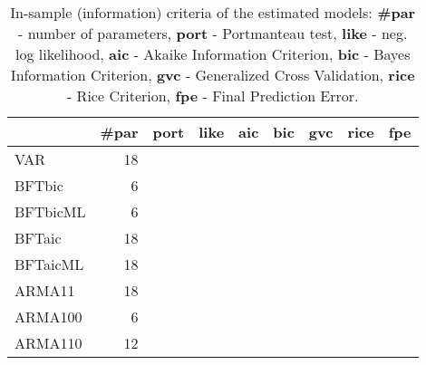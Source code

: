 \documentclass[]{article}
\begin{document}
\begin{table}

\caption{\label{tab:infoTests2}In-sample (information) criteria of the estimated models: 
\textbf{\#par} - number of parameters, \textbf{port} - Portmanteau test, 
\textbf{like} - neg. log likelihood, \textbf{aic} - Akaike Information Criterion,
\textbf{bic} - Bayes  Information Criterion, \textbf{gvc} - Generalized Cross Validation,
\textbf{rice}  - Rice Criterion,  \textbf{fpe} - Final Prediction Error.}
\centering
\begin{tabular}[t]{lrlllllll}
\toprule
\textbf{ } & \textbf{\#par} & \textbf{port} & \textbf{like} & \textbf{aic} & \textbf{bic} & \textbf{gvc} & \textbf{rice} & \textbf{fpe}\\
\midrule
VAR & 18 & \cellcolor{white}{129.6} & \cellcolor{white}{510.6} & \cellcolor{white}{1057.2} & \cellcolor{white}{1129.4} & \cellcolor{white}{1058} & \cellcolor{white}{1058.8} & \cellcolor{white}{1057.2}\\
BFTbic & 6 & \cellcolor{white}{144} & \cellcolor{white}{531.3} & \cellcolor{white}{1074.7} & \cellcolor{white}{1098.7} & \cellcolor{white}{1074.8} & \cellcolor{white}{1074.9} & \cellcolor{white}{1074.7}\\
BFTbicML & 6 & \cellcolor{white}{148.7} & \cellcolor{white}{528.8} & \cellcolor{white}{1069.5} & \cellcolor[HTML]{90EE90}{1093.6} & \cellcolor{white}{1069.6} & \cellcolor{white}{1069.7} & \cellcolor{white}{1069.5}\\
BFTaic & 18 & \cellcolor{white}{123.7} & \cellcolor{white}{513.2} & \cellcolor{white}{1062.4} & \cellcolor{white}{1134.6} & \cellcolor{white}{1063.2} & \cellcolor{white}{1064.1} & \cellcolor{white}{1062.4}\\
BFTaicML & 18 & \cellcolor{white}{124.7} & \cellcolor{white}{509.5} & \cellcolor[HTML]{90EE90}{1055} & \cellcolor{white}{1127.2} & \cellcolor[HTML]{90EE90}{1055.9} & \cellcolor[HTML]{90EE90}{1056.7} & \cellcolor[HTML]{90EE90}{1055.1}\\
ARMA11 & 18 & \cellcolor{white}{249.3} & \cellcolor{white}{566.4} & \cellcolor{white}{1168.8} & \cellcolor{white}{1241} & \cellcolor{white}{1169.6} & \cellcolor{white}{1170.5} & \cellcolor{white}{1168.9}\\
ARMA100 & 6 & \cellcolor{white}{156.1} & \cellcolor{white}{529.5} & \cellcolor{white}{1070.9} & \cellcolor{white}{1095} & \cellcolor{white}{1071} & \cellcolor{white}{1071.1} & \cellcolor{white}{1070.9}\\
ARMA110 & 12 & \cellcolor{white}{138.6} & \cellcolor{white}{519.4} & \cellcolor{white}{1062.9} & \cellcolor{white}{1111} & \cellcolor{white}{1063.2} & \cellcolor{white}{1063.6} & \cellcolor{white}{1062.9}\\

\end{tabular}
\end{table}
\end{document}
